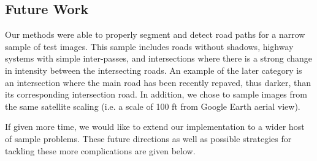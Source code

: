 \documentclass[12pt]{article}
\begin{document}
\subsection*{Future Work}
Our methods were able to properly segment and detect road paths for a narrow sample of test images. This sample includes roads without shadows, highway systems with simple inter-passes, and intersections where there is a strong change in intensity between the intersecting roads. An example of the later category is an intersection where the main road has been recently repaved, thus darker, than its corresponding intersection road. In addition, we chose to sample images from the same satellite scaling (i.e. a scale of 100 ft from Google Earth aerial view). 

If given more time, we would like to extend our implementation to a wider host of sample problems. These future directions as well as possible strategies for tackling these more complications are given below. 
\end{document}
